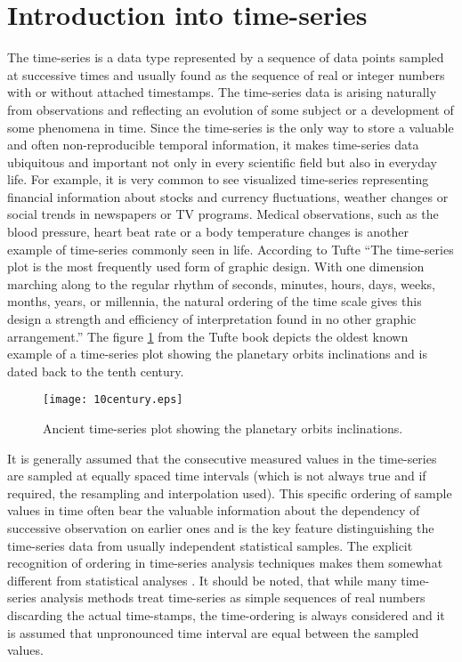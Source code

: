 \section{Introduction into time-series}
The time-series is a data type represented by a sequence of data points sampled at successive times and usually found as the sequence of real or integer numbers with or without attached timestamps. The time-series data is arising naturally from observations and reflecting an evolution of some subject or a development of some phenomena in time. Since the time-series is the only way to store a valuable and often non-reproducible temporal information, it makes time-series data ubiquitous and important not only in every scientific field but also in everyday life. For example, it is very common to see visualized time-series representing financial information about stocks and currency fluctuations, weather changes or social trends in newspapers or TV programs. Medical observations, such as the blood pressure, heart beat rate or a body temperature changes is another example of time-series commonly seen in life. According to Tufte \cite{citeulike:1454223} ``The time-series plot is the most frequently used form of graphic design. With one dimension marching along to the regular rhythm of seconds, minutes, hours, days, weeks, months, years, or millennia, the natural ordering of the time scale gives this design a strength and efficiency of interpretation found in no other graphic arrangement.'' The figure \ref{fig:10century} from the Tufte book depicts the oldest known example of a time-series plot showing the planetary orbits inclinations and is dated back to the tenth century.
\begin{figure}[tbp]
   \centering
   \texttt{[image: 10century.eps]}
   \caption{Ancient time-series plot showing the planetary orbits inclinations.}
   \label{fig:10century}
\end{figure} 

It is generally assumed that the consecutive measured values in the time-series are sampled at equally spaced time intervals (which is not always true and if required, the resampling and interpolation used). This specific ordering of sample values in time often bear the valuable information about the dependency of successive observation on earlier ones and is the key feature distinguishing the time-series data from usually independent statistical samples. 
The explicit recognition of ordering in time-series analysis techniques makes them somewhat different from statistical analyses \cite{citeulike:3989988}. It should be noted, that while many time-series analysis methods treat time-series as simple sequences of real numbers discarding the actual time-stamps, the time-ordering is always considered and it is assumed that unpronounced time interval are equal between the sampled values.

